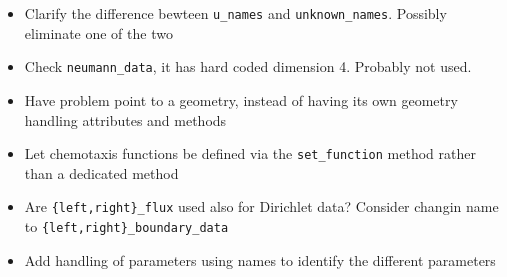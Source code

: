 \begin{todobox}
	\begin{itemize}[leftmargin=1.5em]
		\item Clarify the difference bewteen {\tt u\_names} and {\tt unknown\_names}. Possibly eliminate one of the two
		\item Check {\tt neumann\_data}, it has hard coded dimension 4. Probably not used.
		\item  Have problem point to a geometry, instead of having its own geometry handling attributes and methods
		\item Let chemotaxis functions be defined via the {\tt set\_function} method rather than a dedicated method
		\item Are {\tt \{left,right\}\_flux} used also for Dirichlet data? Consider changin name to {\tt \{left,right\}\_boundary\_data}
		\item Add handling of parameters using names to identify the different parameters
	\end{itemize}
\end{todobox}


